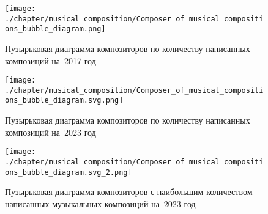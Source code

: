 \begin{figure*}
	\texttt{[image: ./chapter/musical\_composition/Composer\_of\_musical\_compositions\_bubble\_diagram.png]}
	\caption[Пузырьковая диаграмма композиторов по количеству написанных композиций на~2017 год]{Пузырьковая диаграмма композиторов по количеству написанных композиций на~2017 год}%
 	\label{fig:bubbleChart}%
\end{figure*}
\begin{figure*}
	\texttt{[image: ./chapter/musical\_composition/Composer\_of\_musical\_compositions\_bubble\_diagram.svg.png]}
	\caption[Пузырьковая диаграмма композиторов по количеству написанных композиций на~2023 год]{Пузырьковая диаграмма композиторов по количеству написанных композиций на~2023 год}%
	\label{fig:bubbleChart2}%
\end{figure*}

\begin{figure*}
	\texttt{[image: ./chapter/musical\_composition/Composer\_of\_musical\_compositions\_bubble\_diagram.svg\_2.png]}
	\caption[Пузырьковая диаграмма композиторов с наибольшим количеством написанных музыкальных композиций на~2023 год]{Пузырьковая диаграмма композиторов с наибольшим количеством написанных музыкальных композиций на~2023 год}%
	\label{fig:bubbleChart3}%
\end{figure*}

\newpage

